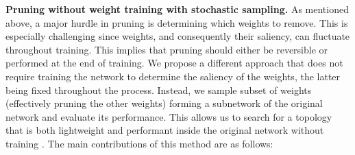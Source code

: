 \noindent \textbf{Pruning without weight training with stochastic sampling.} As
mentioned above, a major hurdle in pruning is determining which weights to
remove. This is especially challenging since weights, and consequently their
saliency, can fluctuate throughout training. This implies that pruning should
either be reversible or performed at the end of training. We propose a different
approach that does not require training the network to determine the saliency of
the weights, the latter being fixed throughout the process. Instead, we sample \DIFaddbegin {}\DIFaddend subset of weights (effectively pruning the other weights) forming a subnetwork
of the original network and evaluate its performance. This allows us to search
for a topology that is both lightweight and performant inside the original
network without training \DIFdelbegin {}\DIFdelend \DIFaddbegin {}\DIFaddend . The main contributions of this method are
as follows: \\


